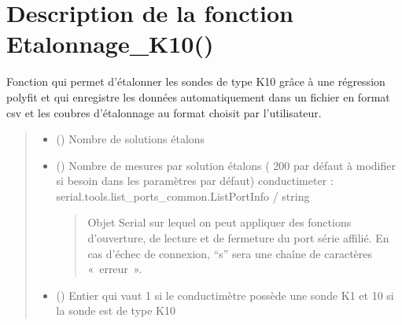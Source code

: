 \documentclass[letterpaper,10pt,french]{sphinxmanual}
\begin{document}
\section{Description de la fonction Etalonnage\_K10()}
\label{\detokenize{Documentation:description-de-la-fonction-etalonnage-k10}}

\begin{fulllineitems}
\label{\detokenize{Documentation:lib_conductimetre.Etalonnage_K10}}
\pysigstartsignatures
{}
\pysigstopsignatures
\sphinxAtStartPar
Fonction qui permet d’étalonner les sondes de type K10 grâce à une régression polyfit et qui enregistre les données automatiquement dans un fichier en format csv et les coubres d’étalonnage au format choisit par l’utilisateur.
\begin{quote}\begin{description}
\begin{itemize}
\item {} 
\sphinxAtStartPar
{} () \textendash{} Nombre de solutions étalons

\item {} 
\sphinxAtStartPar
{} () \textendash{} 
\sphinxAtStartPar
Nombre de mesures par solution étalons ( 200 par défaut à modifier si besoin dans les paramètres par défaut)
conductimeter : serial.tools.list\_ports\_common.ListPortInfo / string
\begin{quote}

\sphinxAtStartPar
Objet Serial sur lequel on peut appliquer des fonctions d’ouverture, de lecture et de fermeture du port série affilié. En cas d’échec de connexion, “s” sera une chaîne de caractères « erreur ».
\end{quote}


\item {} 
\sphinxAtStartPar
{} () \textendash{} Entier qui vaut 1 si le conductimètre possède une sonde K1 et 10 si la sonde est de type K10


\end{itemize}
\end{description}
\end{quote}
\end{fulllineitems}
\end{document}
